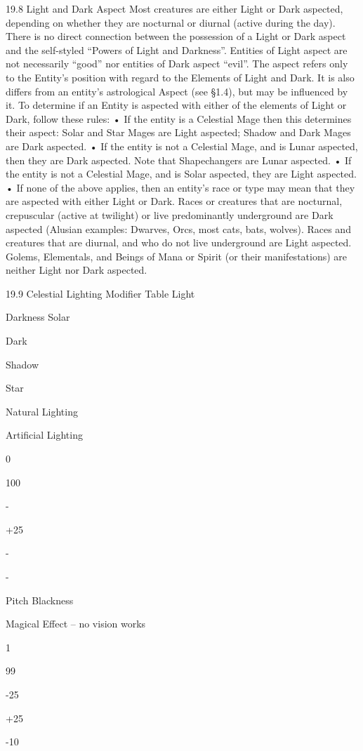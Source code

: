 \documentclass[a4paper]{article}
\begin{document}
\begin{multicols}{3}
19.8 Light and Dark Aspect
Most creatures are either Light or Dark aspected,
depending on whether they are nocturnal or diurnal
(active during the day). There is no direct connection between the possession of a Light or Dark
aspect and the self-styled “Powers of Light and
Darkness”. Entities of Light aspect are not necessarily “good” nor entities of Dark aspect “evil”.
The aspect refers only to the Entity’s position with
regard to the Elements of Light and Dark. It is also
differs from an entity’s astrological Aspect (see
§1.4), but may be influenced by it.
To determine if an Entity is aspected with either of
the elements of Light or Dark, follow these rules:
• If the entity is a Celestial Mage then this determines their aspect: Solar and Star Mages are Light
aspected; Shadow and Dark Mages are Dark aspected.
• If the entity is not a Celestial Mage, and is Lunar
aspected, then they are Dark aspected. Note that
Shapechangers are Lunar aspected.
• If the entity is not a Celestial Mage, and is Solar
aspected, they are Light aspected.
• If none of the above applies, then an entity’s race
or type may mean that they are aspected with either
Light or Dark. Races or creatures that are nocturnal, crepuscular (active at twilight) or live predominantly underground are Dark aspected (Alusian examples: Dwarves, Orcs, most cats, bats,
wolves). Races and creatures that are diurnal, and
who do not live underground are Light aspected.
Golems, Elementals, and Beings of Mana or Spirit
(or their manifestations) are neither Light nor Dark
aspected.

19.9 Celestial Lighting Modifier Table
Light

Darkness Solar

Dark

Shadow

Star

Natural Lighting

Artificial Lighting

0%

100%

-

+25

-

-

Pitch Blackness

Magical Effect – no vision works

1%

99%

-25

+25

-10


\end{multicols}
\end{document}
